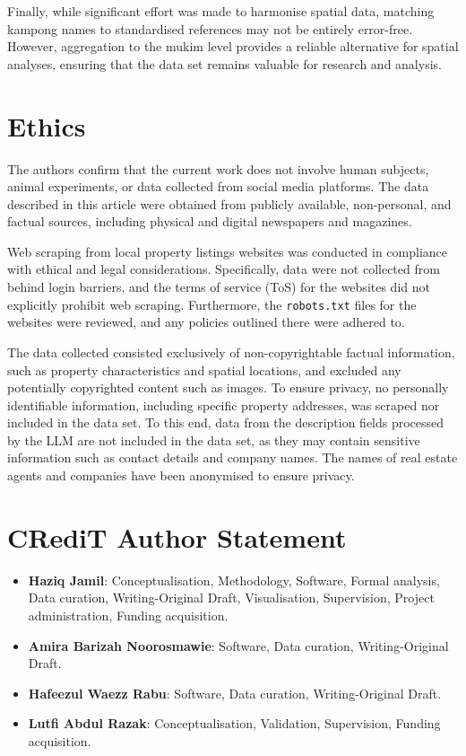 \documentclass[
  number]{elsarticle}
\providecommand{\tightlist}{%
  \setlength{\itemsep}{0pt}\setlength{\parskip}{0pt}}\usepackage{longtable,booktabs,array}
\begin{document}
Finally, while significant effort was made to harmonise spatial data,
matching kampong names to standardised references may not be entirely
error-free. However, aggregation to the mukim level provides a reliable
alternative for spatial analyses, ensuring that the data set remains
valuable for research and analysis.

\section*{Ethics}\label{ethics}

The authors confirm that the current work does not involve human
subjects, animal experiments, or data collected from social media
platforms. The data described in this article were obtained from
publicly available, non-personal, and factual sources, including
physical and digital newspapers and magazines.

Web scraping from local property listings websites was conducted in
compliance with ethical and legal considerations. Specifically, data
were not collected from behind login barriers, and the terms of service
(ToS) for the websites did not explicitly prohibit web scraping.
Furthermore, the \texttt{robots.txt} files for the websites were
reviewed, and any policies outlined there were adhered to.

The data collected consisted exclusively of non-copyrightable factual
information, such as property characteristics and spatial locations, and
excluded any potentially copyrighted content such as images. To ensure
privacy, no personally identifiable information, including specific
property addresses, was scraped nor included in the data set. To this
end, data from the description fields processed by the LLM are not
included in the data set, as they may contain sensitive information such
as contact details and company names. The names of real estate agents
and companies have been anonymised to ensure privacy.

\section*{CRediT Author Statement}\label{credit-author-statement}

\begin{itemize}
\tightlist
\item
  \textbf{Haziq Jamil}: Conceptualisation, Methodology, Software, Formal
  analysis, Data curation, Writing-Original Draft, Visualisation,
  Supervision, Project administration, Funding acquisition.
\item
  \textbf{Amira Barizah Noorosmawie}: Software, Data curation,
  Writing-Original Draft.
\item
  \textbf{Hafeezul Waezz Rabu}: Software, Data curation,
  Writing-Original Draft.
\item
  \textbf{Lutfi Abdul Razak}: Conceptualisation, Validation,
  Supervision, Funding acquisition.
\end{itemize}
\end{document}
